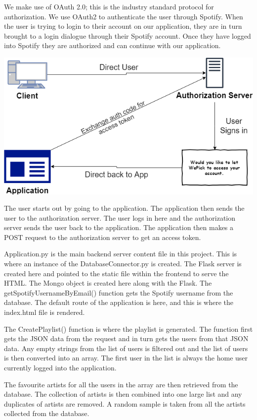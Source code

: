 We make use of OAuth 2.0; this is the industry standard protocol for authorization. We use OAuth2 to authenticate the user through Spotify. When the user is trying to login to their account on our application, they are in turn brought to a login dialogue through their Spotify account. Once they have logged into Spotify they are authorized and can continue with our application. 

\begin{center}    
	\includegraphics{img/auth.png}
\end{center}
The user starts out by going to the application. The application then sends the user to the authorization server. The user logs in here and the authorization server sends the user back to the application. The application then makes a POST request to the authorization server to get an access token.

Application.py is the main backend server content file in this project. This is where an instance of the DatabaseConnector.py is created. The Flask server is created here and pointed to the static file within the frontend to serve the HTML. The Mongo object is created here along with the Flask. The getSpotifyUsernameByEmail() function gets the Spotify username from the database. The default route of the application is here, and this is where the index.html file is rendered.

The CreatePlaylist() function is where the playlist is generated. The function first gets the JSON data from the request and in turn gets the users from that JSON data. Any empty strings from the list of users is filtered out and the list of users is then converted into an array. The first user in the list is always the home user currently logged into the application.

The favourite artists for all the users in the array are then retrieved from the database. The collection of artists is then combined into one large list and any duplicates of artists are removed. A random sample is taken from all the artists collected from the database. 

